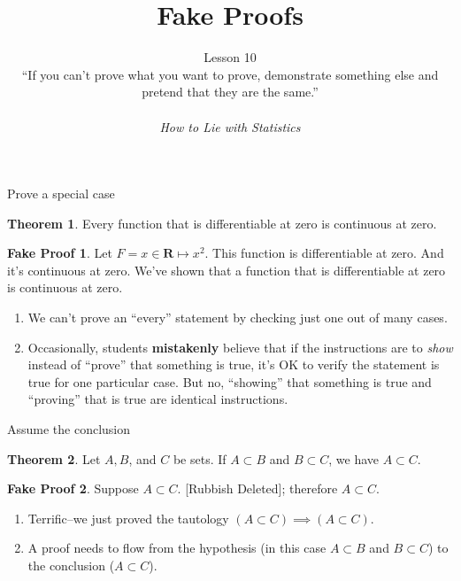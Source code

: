 \documentclass[fleqn]{beamer}
\title{\textbf{Fake Proofs}}
\subtitle{Lesson 10   \\ \vspace{1.5in}
  ``If you can't prove what you want to prove, demonstrate something else and pretend that they are the same.''  \\   \vspace{0.15in}{Darrell Huff} \\ \vspace{0.15in} \emph{How to Lie with Statistics}
   }
\date{}
\newcommand{\reals}{\mathbf{R}}
\theoremstyle{definition}
\newtheorem{myth}{Theorem}
\newtheorem{myfakeproof}{Fake Proof}
\begin{document}
\frame{\titlepage}

\begin{frame}{Prove a special case}

\begin{myth}   Every function  that is differentiable at zero is continuous at zero.  \end{myth}

\begin{myfakeproof}  Let \(F = x \in \reals \mapsto x^2\).  This function is differentiable at zero. And it's continuous at zero. We've shown that  a function that is differentiable at zero is continuous at zero.
\end{myfakeproof}

\begin{enumerate}
\item We can't prove an ``every'' statement by checking just one out of many cases.
\item Occasionally, students \textbf{mistakenly} believe that if the instructions are to \emph{show} instead of ``prove'' that something is true, it's OK to verify the statement is true for one particular case. But no, ``showing'' that something is true and ``proving'' that is true are identical instructions.


\end{enumerate}

\end{frame}

\begin{frame}{Assume the conclusion}


\begin{myth}   Let \(A,B\),  and \(C\) be sets.  If \(A \subset B\) and \(B \subset C\), we have \(A \subset C\). \end{myth}

\begin{myfakeproof}  Suppose \(A \subset C\).  [Rubbish Deleted]; therefore  \(A \subset C\). \end{myfakeproof}

\begin{enumerate}
\item Terrific--we just proved the tautology \(   (A \subset C) \implies  (A \subset C) \).

\item A proof needs to flow from the hypothesis (in this case  \(A \subset B\) and \(B \subset C\)) to the conclusion (\(A \subset C\)).
\end{enumerate}

\end{frame}
\end{document}
